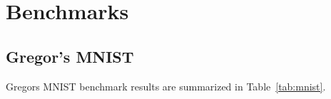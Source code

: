 \documentclass[sigplan,screen]{acmart}
\begin{document}




\section{Benchmarks}


\subsection{Gregor's MNIST}

Gregors MNIST benchmark results are summarized in Table~\ref{tab:mnist}.
\end{document}
